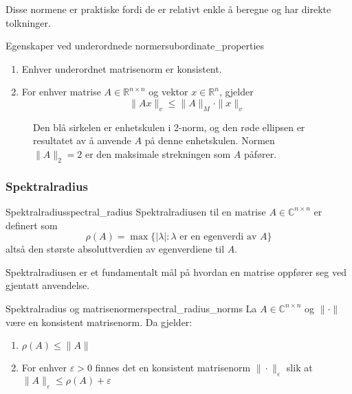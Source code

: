 Disse normene er praktiske fordi de er relativt enkle å beregne og har direkte tolkninger.

\begin{theorem}{Egenskaper ved underordnede normer}{subordinate_properties}
	\begin{enumerate}
		\item Enhver underordnet matrisenorm er konsistent.
		\item For enhver matrise $A \in \mathbb{R}^{n \times n}$ og vektor $x \in \mathbb{R}^n$, gjelder
		      \[
			      \|Ax\|_v \leq \|A\|_M \cdot \|x\|_v
		      \]
	\end{enumerate}
\end{theorem}

\begin{figure}
	\centering
	
	\caption{Den blå sirkelen er enhetskulen i 2-norm, og den røde ellipsen er resultatet av å anvende $A$ på denne enhetskulen. Normen $\|A\|_2 = 2$ er den maksimale strekningen som $A$ påfører.}
	\label{fig:matrix_norm}
\end{figure}

\subsubsection{Spektralradius}

\begin{definition}{Spektralradius}{spectral_radius}
	Spektralradiusen til en matrise $A \in \mathbb{C}^{n \times n}$ er definert som
	\[
		\rho(A) = \max\{|\lambda| : \lambda \text{ er en egenverdi av } A\}
	\]
	altså den største absoluttverdien av egenverdiene til $A$.
\end{definition}

Spektralradiusen er et fundamentalt mål på hvordan en matrise oppfører seg ved gjentatt anvendelse.

\begin{theorem}{Spektralradius og matrisenormer}{spectral_radius_norms}
	La $A \in \mathbb{C}^{n \times n}$ og $\|\cdot\|$ være en konsistent matrisenorm. Da gjelder:
	\begin{enumerate}
		\item $\rho(A) \leq \|A\|$
		\item For enhver $\varepsilon > 0$ finnes det en konsistent matrisenorm $\|\cdot\|_\varepsilon$ slik at $\|A\|_\varepsilon \leq \rho(A) + \varepsilon$
	\end{enumerate}
\end{theorem}

